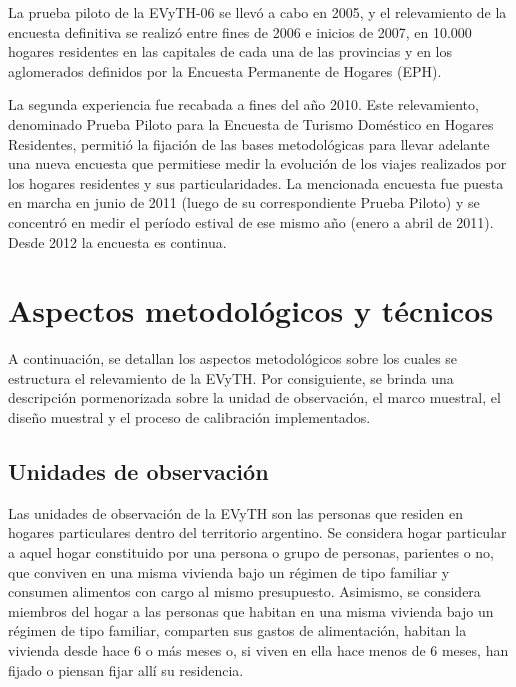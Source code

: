 \documentclass[
  openany]{book}
\begin{document}
La prueba piloto de la EVyTH-06 se llevó a cabo en 2005, y el relevamiento de la encuesta definitiva se realizó entre fines de 2006 e inicios de 2007, en 10.000 hogares residentes en las capitales de cada una de las provincias y en los aglomerados definidos por la Encuesta Permanente de Hogares (EPH).

La segunda experiencia fue recabada a fines del año 2010. Este relevamiento, denominado Prueba Piloto para la Encuesta de Turismo Doméstico en Hogares Residentes, permitió la fijación de las bases metodológicas para llevar adelante una nueva encuesta que permitiese medir la evolución de los viajes realizados por los hogares residentes y sus particularidades. La mencionada encuesta fue puesta en marcha en junio de 2011 (luego de su correspondiente Prueba Piloto) y se concentró en medir el período estival de ese mismo año (enero a abril de 2011). Desde 2012 la encuesta es continua.

\hypertarget{aspectos-metodoluxf3gicos-y-tuxe9cnicos}{%
\chapter{\texorpdfstring{\textbf{Aspectos metodológicos y técnicos}}{Aspectos metodológicos y técnicos}}\label{aspectos-metodoluxf3gicos-y-tuxe9cnicos}}

A continuación, se detallan los aspectos metodológicos sobre los cuales se estructura el relevamiento de la EVyTH. Por consiguiente, se brinda una descripción pormenorizada sobre la unidad de observación, el marco muestral, el diseño muestral y el proceso de calibración implementados.

\hypertarget{unidades-de-observaciuxf3n}{%
\section{Unidades de observación}\label{unidades-de-observaciuxf3n}}

Las unidades de observación de la EVyTH son las personas que residen en hogares particulares dentro del territorio argentino. Se considera hogar particular a aquel hogar constituido por una persona o grupo de personas, parientes o no, que conviven en una misma vivienda bajo un régimen de tipo familiar y consumen alimentos con cargo al mismo presupuesto. Asimismo, se considera miembros del hogar a las personas que habitan en una misma vivienda bajo un régimen de tipo familiar, comparten sus gastos de alimentación, habitan la vivienda desde hace 6 o más meses o, si viven en ella hace menos de 6 meses, han fijado o piensan fijar allí su residencia.
\end{document}
